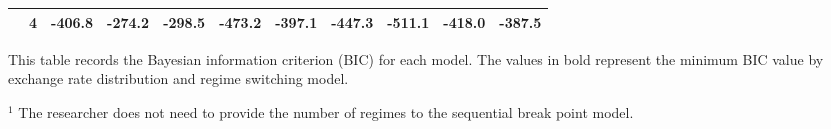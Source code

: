 \documentclass[12pt]{article}
\begin{document}
\begin{landscape}
\begin{table}
\begin{tabular}[c]{l c r r r | r r r | r r r}
				    & 4 &           -406.8 &  -274.2 &  -298.5 &           -473.2 &  -397.1 &  -447.3 &   \textbf{-511.1} &  -418.0 &   -387.5  \\
		\hline
	\end{tabular}
	\begin{tablenotes}
		\item{This table records the Bayesian information criterion (BIC) for each model. The values in bold represent the minimum BIC value by exchange rate distribution and regime switching model.}
		\item{\footnotesize $^{1}$ The researcher does not need to provide the number of regimes to the sequential break point model.}
	\end{tablenotes}
	\label{tbl:BIC_model_comparison}
\end{table}



\end{landscape}
\end{document}
